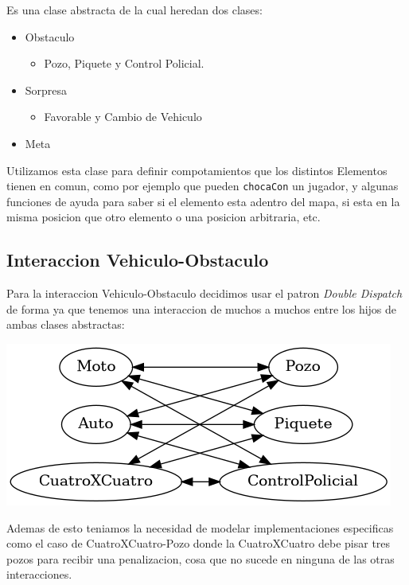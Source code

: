 \documentclass[titlepage,a4paper]{article}
\begin{document}
Es una clase abstracta de la cual heredan dos clases:

\begin{itemize}
\item Obstaculo
\begin{itemize}
\item Pozo, Piquete y Control Policial.
\end{itemize}
\item Sorpresa
\begin{itemize}
\item Favorable y Cambio de Vehiculo
\end{itemize}
\item Meta
\end{itemize}

Utilizamos esta clase para definir compotamientos que los distintos
Elementos tienen en comun, como por ejemplo que pueden \texttt{chocaCon} un
jugador, y algunas funciones de ayuda para saber si el elemento esta
adentro del mapa, si esta en la misma posicion que otro elemento o una
posicion arbitraria, etc.

\subsection{Interaccion Vehiculo-Obstaculo}
\label{sec:orgdc55730}

Para la interaccion Vehiculo-Obstaculo decidimos usar el patron \emph{Double
Dispatch} de forma ya que tenemos una interaccion de muchos a muchos entre los
hijos de ambas clases abstractas:

\begin{center}
\includegraphics[width=.9\linewidth]{diagramas/interaccionVehiculoObstaculo.png}
\end{center}

Ademas de esto teniamos la necesidad de modelar implementaciones especificas
como el caso de CuatroXCuatro-Pozo donde la CuatroXCuatro debe pisar tres pozos
para recibir una penalizacion, cosa que no sucede en ninguna de las otras interacciones.
\end{document}
